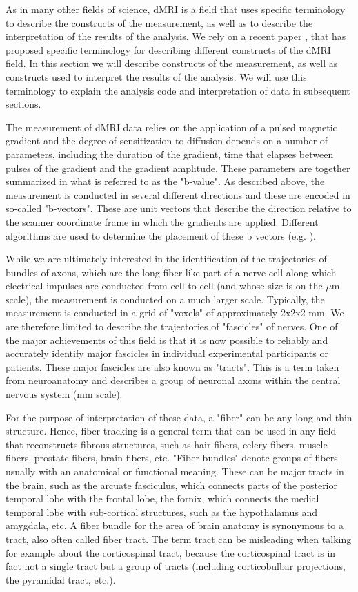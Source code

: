 \documentclass{bioinfo}
\begin{document}
As in many other fields of science, dMRI is a field that uses specific terminology to describe the constructs of the measurement, as well as to describe the interpretation of the results of the analysis. We rely on a recent paper \citep{Cote2013tractometer}, that has proposed specific terminology for describing different constructs of the dMRI field. In this section we will describe constructs of the measurement, as well as constructs used to interpret the results of the analysis. We will use this terminology to explain the analysis code and interpretation of data in subsequent sections.

The measurement of dMRI data relies on the application of a pulsed magnetic gradient and the degree of sensitization to diffusion depends on a number of parameters, including the duration of the gradient, time that elapses between pulses of the gradient and the gradient amplitude. These parameters are together summarized in what is referred to as the "b-value".  As described above, the measurement is conducted in several different directions and these are encoded in so-called "b-vectors". These are unit vectors that describe the direction relative to the scanner coordinate frame in which the gradients are applied. Different algorithms are used to determine the placement of these b vectors (e.g. \citep{jones-etal:99}).

While we are ultimately interested in the identification of the trajectories of bundles of axons, which are the long fiber-like part of a nerve cell along which electrical impulses are conducted from cell to cell (and whose size is on the $\mu$m scale), the measurement is conducted on a much larger scale. Typically, the measurement is conducted in a grid of "voxels" of approximately 2x2x2 mm. We are therefore limited to describe the trajectories of "fascicles" of nerves. One of the major achievements of this field is that it is now possible to reliably and accurately identify major fascicles in individual experimental participants or patients. These major fascicles are also known as "tracts". This is a term taken from neuroanatomy and describes a group of neuronal axons within the central nervous system (mm scale).

For the purpose of interpretation of these data, a "fiber" can be any long and thin structure. Hence, fiber tracking is a general term that can be used in any field that reconstructs fibrous structures, such as hair fibers, celery fibers, muscle fibers, prostate fibers, brain fibers, etc. "Fiber bundles" denote groups of fibers usually with an anatomical or functional meaning. These can be major tracts in the brain, such as the arcuate fasciculus, which connects parts of the posterior temporal lobe with the frontal lobe, the fornix, which connects the medial temporal lobe with sub-cortical structures, such as the hypothalamus and amygdala,  etc. A fiber bundle for the area of brain anatomy is synonymous to a tract, also often called fiber tract. The term tract can be misleading when talking for example about the corticospinal tract, because the corticospinal tract is in fact not a single tract but a group of tracts (including corticobulbar projections, the pyramidal tract, etc.).
\end{document}
